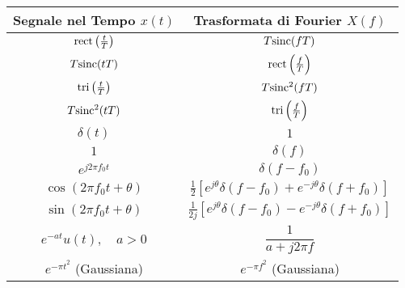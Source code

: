 \begin{center}
\begin{tabular}{c c}
    \toprule
    \textbf{Segnale nel Tempo $x(t)$} & \textbf{Trasformata di Fourier $X(f)$} \\
    \midrule
    $\text{rect}\left(\frac{t}{T}\right)$ & $T \text{sinc}(fT)$ \\
    \addlinespace
    $T \text{sinc}(tT)$ & $\text{rect}\left(\frac{f}{T}\right)$ \\
    \addlinespace
    $\text{tri}\left(\frac{t}{T}\right)$ & $T \text{sinc}^2(fT)$ \\
    \addlinespace
    $T \text{sinc}^2(tT)$ & $\text{tri}\left(\frac{f}{T}\right)$ \\
    \addlinespace
    $\delta(t)$ & $1$ \\
    \addlinespace
    $1$ & $\delta(f)$ \\
    \addlinespace
    $e^{j2\pi f_0 t}$ & $\delta(f - f_0)$ \\
    \addlinespace
    $\cos(2\pi f_0 t + \theta)$ & $\frac{1}{2}\left[e^{j\theta}\delta(f - f_0) + e^{-j\theta}\delta(f + f_0)\right]$ \\
    \addlinespace
    $\sin(2\pi f_0 t + \theta)$ & $\frac{1}{2j}\left[e^{j\theta}\delta(f - f_0) - e^{-j\theta}\delta(f + f_0)\right]$ \\
    \addlinespace
    $e^{-at} u(t), \quad a>0$ & $\dfrac{1}{a + j2\pi f}$ \\
    \addlinespace
    $e^{-\pi t^2}$ (Gaussiana) & $e^{-\pi f^2}$ (Gaussiana) \\
    \bottomrule
\end{tabular}
\end{center}

